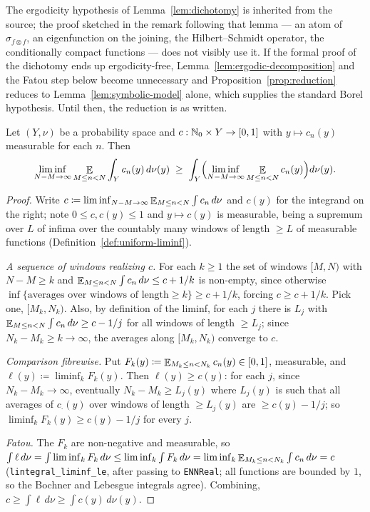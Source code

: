 \begin{remark}
  The ergodicity hypothesis of Lemma~\ref{lem:dichotomy} is inherited from the source; the
  proof sketched in the remark following that lemma --- an atom of $\sigma_{f\otimes f}$, an
  eigenfunction on the joining, the Hilbert--Schmidt operator, the conditionally compact
  functions --- does not visibly use it.  If the formal proof of the dichotomy ends up
  ergodicity-free, Lemma~\ref{lem:ergodic-decomposition} and the Fatou step below become
  unnecessary and Proposition~\ref{prop:reduction} reduces to Lemma~\ref{lem:symbolic-model}
  alone, which supplies the standard Borel hypothesis.  Until then, the reduction is as
  written.
\end{remark}

\begin{lemma}
  \label{lem:fatou-uniform}
  \leanok
  Let $(Y,\nu)$ be a probability space and $c : \mathbb{N}_0 \times Y \to [0,1]$ with
  $y \mapsto c_n(y)$ measurable for each $n$.  Then
  \[
    \liminf_{N-M \to \infty} \mathop{\mathbb{E}}_{M \leq n < N} \int_Y c_n(y)\,d\nu(y) \;\geq\; \int_Y \Bigl( \liminf_{N-M \to \infty} \mathop{\mathbb{E}}_{M \leq n < N} c_n(y) \Bigr) d\nu(y) .
  \]
\end{lemma}

\begin{proof}
  Write $c \coloneqq \liminf_{N-M \to \infty} \mathop{\mathbb{E}}_{M \leq n < N} \int c_n\,d\nu$ and $c(y)$ for the integrand on
  the right; note $0 \leq c, c(y) \leq 1$ and $y \mapsto c(y)$ is measurable, being a
  supremum over $L$ of infima over the countably many windows of length $\geq L$ of measurable
  functions (Definition~\ref{def:uniform-liminf}).

  \emph{A sequence of windows realizing $c$.}  For each $k \geq 1$ the set of windows
  $[M,N)$ with $N - M \geq k$ and $\mathop{\mathbb{E}}_{M \leq n < N} \int c_n\,d\nu \leq c + 1/k$ is non-empty, since
  otherwise $\inf\{\text{averages over windows of length} \geq k\} \geq c + 1/k$, forcing
  $c \geq c + 1/k$.  Pick one, $[M_k,N_k)$.  Also, by definition of the liminf, for each $j$
  there is $L_j$ with $\mathop{\mathbb{E}}_{M \leq n < N} \int c_n\,d\nu \geq c - 1/j$ for all windows of length $\geq L_j$;
  since $N_k - M_k \geq k \to \infty$, the averages along $[M_k,N_k)$ converge to $c$.

  \emph{Comparison fibrewise.}  Put $F_k(y) \coloneqq \mathop{\mathbb{E}}_{M_k \leq n < N_k} c_n(y) \in [0,1]$,
  measurable, and $\ell(y) \coloneqq \liminf_k F_k(y)$.  Then $\ell(y) \geq c(y)$: for each
  $j$, since $N_k - M_k \to \infty$, eventually $N_k - M_k \geq L_j(y)$ where $L_j(y)$ is such
  that all averages of $c_\cdot(y)$ over windows of length $\geq L_j(y)$ are $\geq c(y) - 1/j$;
  so $\liminf_k F_k(y) \geq c(y) - 1/j$ for every $j$.

  \emph{Fatou.}  The $F_k$ are non-negative and measurable, so
  $\int \ell\,d\nu = \int \liminf_k F_k\,d\nu \leq \liminf_k \int F_k\,d\nu
   = \liminf_k \mathop{\mathbb{E}}_{M_k\leq n<N_k}\int c_n\,d\nu = c$ (\texttt{lintegral\_liminf\_le}, after
  passing to \texttt{ENNReal}; all functions are bounded by $1$, so the Bochner and Lebesgue
  integrals agree).  Combining, $c \geq \int \ell\,d\nu \geq \int c(y)\,d\nu(y)$.
\end{proof}

